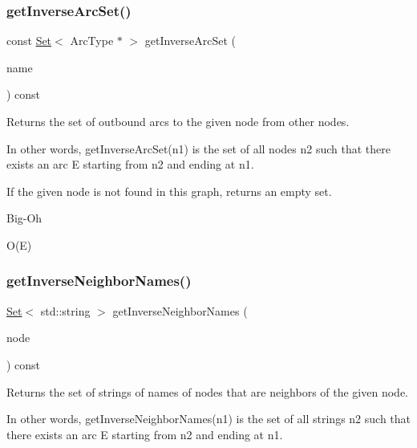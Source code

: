 \subsubsection{\texorpdfstring{get\+Inverse\+Arc\+Set()}{getInverseArcSet()}\hspace{0.1cm}{\footnotesize\ttfamily [2/2]}}
{\footnotesize\ttfamily const \mbox{\hyperlink{classstanfordcpplib_1_1collections_1_1GenericSet}{Set}}$<$ Arc\+Type $\ast$ $>$ get\+Inverse\+Arc\+Set (\begin{DoxyParamCaption}\item[{const std\+::string \&}]{name }\end{DoxyParamCaption}) const}



Returns the set of outbound arcs to the given node from other nodes. 

In other words, get\+Inverse\+Arc\+Set(n1) is the set of all nodes n2 such that there exists an arc E starting from n2 and ending at n1.

If the given node is not found in this graph, returns an empty set. \begin{DoxyRefDesc}{Big-\/\+Oh}
\item[\mbox{\hyperlink{BigOh__BigOh000066}{Big-\/\+Oh}}]O(\+E) \end{DoxyRefDesc}
\mbox{\label{classGraph_aa9eceee00e824ea4852449fa3de61e82}} 
\subsubsection{\texorpdfstring{get\+Inverse\+Neighbor\+Names()}{getInverseNeighborNames()}\hspace{0.1cm}{\footnotesize\ttfamily [1/2]}}
{\footnotesize\ttfamily \mbox{\hyperlink{classstanfordcpplib_1_1collections_1_1GenericSet}{Set}}$<$ std\+::string $>$ get\+Inverse\+Neighbor\+Names (\begin{DoxyParamCaption}\item[{Node\+Type $\ast$}]{node }\end{DoxyParamCaption}) const}



Returns the set of strings of names of nodes that are neighbors of the given node. 

In other words, get\+Inverse\+Neighbor\+Names(n1) is the set of all strings n2 such that there exists an arc E starting from n2 and ending at n1.


